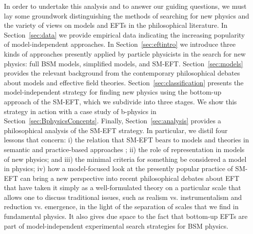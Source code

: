 In order to undertake this analysis and to answer our guiding questions, we must lay some groundwork distinguishing the methods of searching for new physics and the variety of views on models and EFTs in the philosophical literature. 
In Section~\ref{sec:data} we provide empirical data indicating the increasing popularity of model-independent approaches. 
In Section~\ref{sec:eftintro} we introduce three kinds of approaches presently applied by particle physicists in the search for new physics: full BSM models, simplified models, and SM-EFT. 
Section~\ref{sec:models} provides the relevant background from the contemporary philosophical debates about models and effective field theories. 
Section~\ref{sec:classification} presents the model-independent strategy for finding new physics using the bottom-up approach of the SM-EFT, which we subdivide into three stages.
We show this strategy in action with a case study of b-physics in Section~\ref{sec:BphysicsConcepts}. 
Finally, Section~\ref{sec:analysis} provides a philosophical analysis of the SM-EFT strategy.  
In particular, we distil four lessons that concern: i) the relation that SM-EFT bears to models and theories in semantic \citep{hartmann1998} and practice-based approaches \citep{morganmorrison}; ii) the role of representation in models of new physics; and iii) the minimal criteria for something be considered a model in physics; iv) how a model-focused look at the presently popular practice of SM-EFT can bring a new perspective into recent philosophical debates about EFT that have taken it simply as a well-formulated theory on a particular scale that allows one to discuss traditional issues, such as realism vs. instrumentalism and reduction vs. emergence, in the light of the separation of scales that we find in fundamental physics. It also gives due space to the fact that bottom-up EFTs are part of model-independent experimental search strategies for BSM physics.
